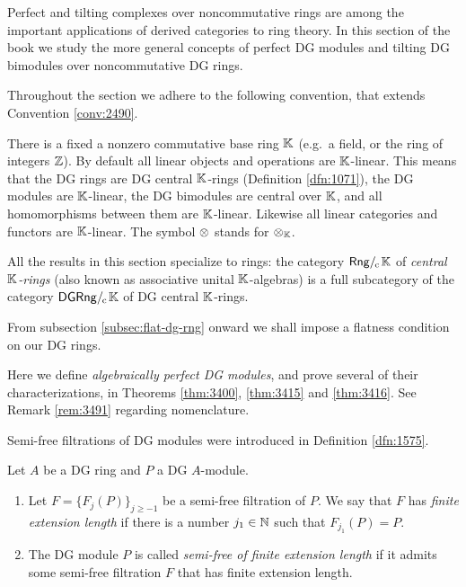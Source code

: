 

\renewcommand{\thisfile}{block5\_190328}  

\cleardoublepage 
{} 
\label{sec:perf-tilt-NC}
 
\AYcopyright

Perfect and tilting complexes over noncommutative rings are 
among the important applications of derived categories to ring theory. 
In this section of the book we study the more general concepts of 
perfect DG modules and tilting DG bimodules over noncommutative DG rings. 

Throughout the section we adhere to the following convention, that extends 
Convention \ref{conv:2490}. 

\begin{conv} \label{conv:3485}
There is a fixed a nonzero commutative base ring $\mathbb{K}$ (e.g.\ a field, or 
the ring of integers $\mathbb{Z}$). By default all linear objects and operations are 
$\mathbb{K}$-linear. This means that the DG rings are DG central $\mathbb{K}$-rings (Definition 
\ref{dfn:1071}), the DG modules are $\mathbb{K}$-linear, the DG bimodules 
are central over $\mathbb{K}$, and all homomorphisms between them are $\mathbb{K}$-linear. 
Likewise all linear categories and functors are $\mathbb{K}$-linear.
The symbol $\otimes$ stands for $\otimes_{\mathbb{K}}$. 
\end{conv}

All the results in this section specialize to rings: the category 
$\mathrm{\mathsf{Rng}} /_{\mspace{-2mu} \mathrm{c}} \mspace{2mu} \mathbb{K}$ of {\em central $\mathbb{K}$-rings} (also known as 
associative unital $\mathbb{K}$-algebras) is a full subcategory of the category
$\mathrm{\mathsf{DGRng}} /_{\mspace{-2mu} \mathrm{c}} \mspace{2mu} \mathbb{K}$ of DG central $\mathbb{K}$-rings. 

From subsection \ref{subsec:flat-dg-rng} onward we shall impose a flatness 
condition on our DG rings. 



\label{subsec:perf-dgmods}
Here we define {\em algebraically perfect DG modules}, and prove several of 
their characterizations, in Theorems \ref{thm:3400}, \ref{thm:3415} and 
\ref{thm:3416}. See Remark \ref{rem:3491} regarding nomenclature. 

Semi-free filtrations of DG modules were introduced in Definition 
\ref{dfn:1575}. 

\begin{dfn} \label{dfn:3411}
Let $A$ be a DG ring and $P$ a DG $A$-module. 
\begin{enumerate}
\item Let $F = \bigl\{ F_j(P) \bigr\}_{j \geq -1}$ be a semi-free filtration of 
$P$. We say that $F$ has {\em finite extension length} if 
there is a number $j_1 \in \mathbb{N}$ such that $F_{j_1}(P) = P$.

\item The DG module $P$ is called {\em semi-free of finite extension length} 
if it admits some semi-free filtration $F$ that has finite extension length. 
\end{enumerate}
\end{dfn}

